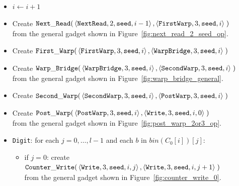 \begin{itemize}
    \item $i \gets i + 1$

    \item Create
    $\begin{aligned}[t]
        {\tt Next\_Read}(&\left\langle {\tt NextRead},  2, {\tt seed}, i - 1 \right\rangle,
                   \left\langle {\tt FirstWarp}, 3, {\tt seed}, i     \right\rangle \;)
    \end{aligned}$\\ from the general gadget shown in Figure~\ref{fig:next_read_2_seed_op}.

    \item Create
    $\begin{aligned}[t]
        {\tt First\_Warp}(&\left\langle {\tt FirstWarp},  3, {\tt seed}, i \right\rangle,
                    \left\langle {\tt WarpBridge}, 3, {\tt seed}, i \right\rangle \;)
    \end{aligned}$

    \item Create
    $\begin{aligned}[t]
        {\tt Warp\_Bridge}(&\left\langle {\tt WarpBridge}, 3, {\tt seed}, i \right\rangle,
                     \left\langle {\tt SecondWarp}, 3, {\tt seed}, i \right\rangle \;)
    \end{aligned}$\\ from the general gadget shown in Figure~\ref{fig:warp_bridge_general}.

    \item Create
    $\begin{aligned}[t]
        {\tt Second\_Warp}(&\left\langle {\tt SecondWarp}, 3, {\tt seed}, i  \right\rangle,
                     \left\langle {\tt PostWarp},   3, {\tt seed}, i  \right\rangle \;)
    \end{aligned}$

    \item Create
    $\begin{aligned}[t]
        {\tt Post\_Warp}(&\left\langle {\tt PostWarp}, 3, {\tt seed}, i    \right\rangle,
                   \left\langle {\tt Write},    3, {\tt seed}, i, 0 \right\rangle \;)
    \end{aligned}$\\from the general gadget shown in Figure~\ref{fig:post_warp_2or3_op}.


    \item {\tt Digit}: for each $j=0,\ldots,l-1$ and each $b$ in $bin(C_0[i])[j]$:
    \begin{itemize}
        \item if $j = 0$: create
        $\begin{aligned}[t]
            {\tt Counter\_Write}(&\left\langle {\tt Write}, 3, {\tt seed}, i, j \right\rangle, \left\langle {\tt Write}, 3, {\tt seed}, i, j + 1 \right\rangle \;)
        \end{aligned}$\\from the general gadget shown in Figure~\ref{fig:counter_write_0}.


\end{itemize}
\end{itemize}
